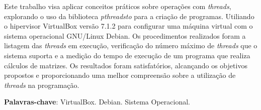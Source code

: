 \documentclass[
	12pt,				%
	oneside,   	        %
	a4paper,			%
	english,			%
	french,				%
	spanish,			%
	brazil,				%
	]{pacotes/abntex2}
\begin{document}
\frenchspacing 



\imprimirfolhaderosto



\begin{resumo}
Este trabalho visa aplicar conceitos práticos sobre operações com \textit{threads}, explorando o uso da biblioteca \textit{pthreadsto} para a criação de programas. Utiliando o hipervisor VirtualBox versão 7.1.2 para configurar uma máquina virtual com o sistema operacional GNU/Linux Debian. Os procedimentos realizados foram a listagem das \textit{threads} em execução, verificação do número máximo de \textit{threads} que o sistema suporta e a medição do tempo de execução de um programa que realiza cálculos de matrizes. Os resultados foram satisfatórios, alcançando os objetivos propostos e proporcionando uma melhor compreensão sobre a utilização de \textit{threads} na programação.

 \vspace{\onelineskip}
    
 \noindent
 \textbf{Palavras-chave}: VirtualBox. Debian. Sistema Operacional.
\end{resumo}




\tableofcontents*
\cleardoublepage
\end{document}
